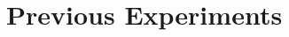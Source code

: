 \renewcommand{\thechapter}{A}
\renewcommand{\chaptername}{Appendix}

\chapter{Previous Experiments}

